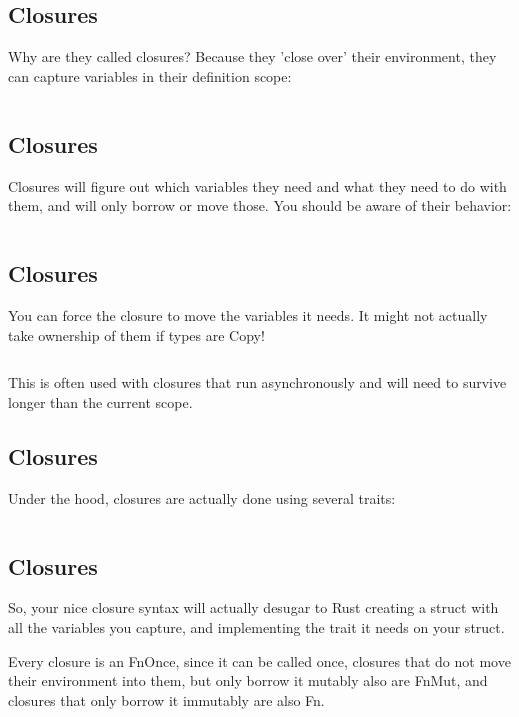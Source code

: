 \documentclass[usenames,twocolumn,dvipsnames,10pt,a4wide]{article}
\begin{document}
	\inputminted[fontsize=\normalsize]{rust}{code/closures3.rs}


\subsection{Closures}
	Why are they called closures? Because they 'close over'
	their environment, they can capture variables in their
	definition scope:
	
	\inputminted[fontsize=\normalsize]{rust}{code/closures4.rs}


\subsection{Closures}
	Closures will figure out which variables they need and
	what they need to do with them, and will only borrow or
	move those. You should be aware of their behavior:
	
	\inputminted[fontsize=\normalsize]{rust}{code/closures5.rs}


\subsection{Closures}
	You can force the closure to move the variables it needs.
	It might not actually take ownership of them if types are Copy!
	
	\inputminted[fontsize=\normalsize]{rust}{code/closures6.rs}
	
	This is often used with closures that run asynchronously
	and will need to survive longer than the current scope.


\subsection{Closures}
	Under the hood, closures are actually done using several traits:
	
	\inputminted[fontsize=\normalsize]{rust}{code/closures7.rs}


\subsection{Closures}
	So, your nice closure syntax will actually desugar to Rust
	creating a struct with all the variables you capture, and
	implementing the trait it needs on your struct.
	
	Every closure is an FnOnce, since it can be called once,
	closures that do not move their environment into them,
	but only borrow it mutably also are FnMut, and closures
	that only borrow it immutably are also Fn.
\end{document}
